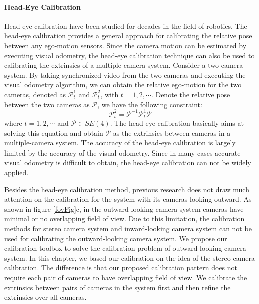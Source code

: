 \documentclass{report}
\begin{document}
\paragraph{Head-Eye Calibration}
Head-eye calibration have been studied for decades in the field of robotics. The head-eye calibration provides a general approach for calibrating the relative pose between any ego-motion sensors. Since the camera motion can be estimated by executing visual odometry, the head-eye calibration technique can also be used to calibrating the extrinsics of a multiple-camera system. Consider a two-camera system. By taking synchronized video from the two cameras and executing the visual odometry algorithm, we can obtain the relative ego-motion for the two cameras, denoted as $\mathcal{P}_t^1$ and $\mathcal{P}_t^2$, with $t = 1, 2, \cdots$. Denote the relative pose between the two cameras as $\mathcal{P}$, we have the following constraint: 
\begin{equation}
\mathcal{P}_t^2 = \mathcal{P}^{-1} \mathcal{P}_t^1 \mathcal{P}
\end{equation}
where $t = 1, 2, \cdots$ and $\mathcal{P} \in {SE}(4)$. The head eye calibration basically aims at solving this equation and obtain $\mathcal{P}$ as the extrinsics between cameras in a multiple-camera system. The accuracy of the head-eye calibration is largely limited by the accuracy of the visual odometry. Since in many cases accurate visual odometry is difficult to obtain, the head-eye calibration can not be widely applied. 

\bigskip
Besides the head-eye calibration method, previous research does not draw much attention on the calibration for the system with its cameras looking outward. As shown in figure \ref{fovFig}c, in the outward-looking camera system cameras have minimal or no overlapping field of view. Due to this limitation, the calibration methods for stereo camera system and inward-looking camera system can not be used for calibrating the outward-looking camera system. We propose our calibration toolbox to solve the calibration problem of outward-looking camera system. 
In this chapter, we based our calibration on the idea of the stereo camera calibration. The difference is that our proposed calibration pattern does not require each pair of cameras to have overlapping field of view. We calibrate the extrinsics between pairs of cameras in the system first and then refine the extrinsics over all cameras. 
\end{document}
